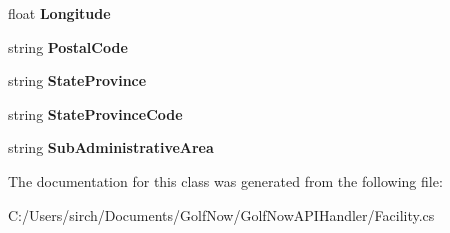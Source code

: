 \begin{DoxyCompactItemize}
float {\bfseries Longitude}
\item 
\mbox{\label{class_golf_now_a_p_i_1_1_address_a07b426913b35dd4753fa7f4bc6469196}} 
string {\bfseries Postal\+Code}
\item 
\mbox{\label{class_golf_now_a_p_i_1_1_address_a653649f487a04b6a2b312ad9ac065df1}} 
string {\bfseries State\+Province}
\item 
\mbox{\label{class_golf_now_a_p_i_1_1_address_ace4b236130c6b2c99cb89852d8587677}} 
string {\bfseries State\+Province\+Code}
\item 
\mbox{\label{class_golf_now_a_p_i_1_1_address_ad8fbe11677bf5b121dc0e50f12c0e48f}} 
string {\bfseries Sub\+Administrative\+Area}
\end{DoxyCompactItemize}


The documentation for this class was generated from the following file\+:\begin{DoxyCompactItemize}
\item 
C\+:/\+Users/sirch/\+Documents/\+Golf\+Now/\+Golf\+Now\+A\+P\+I\+Handler/Facility.\+cs\end{DoxyCompactItemize}

